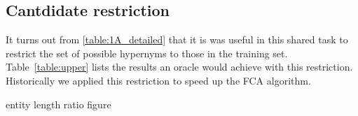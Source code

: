 \documentclass[11pt,a4paper]{article}
\begin{document}
\begin{table}
	\centering
\caption{Ablation experiments on the 1A dataset with $k=200,ns=50$ (and the 
implementation of the is\_frequent\_hypernym fixed).}
\label{table:ablation1A}
\end{table}

\subsection{Cantdidate restriction}

It turns out from \autoref{table:1A_detailed} that it is was useful in this
shared task to restrict the set of possible hypernyms to those in the training
set.  Table~\ref{table:upper} lists the results an oracle would achieve with
this restriction. Historically we applied this restriction to speed up the FCA
algorithm.

\begin{table}
	\centering
  \caption{Results of an oracle restricted to the training hypernyms.}
	\label{table:upper}
\end{table}

entity length ratio figure %




\end{document}
